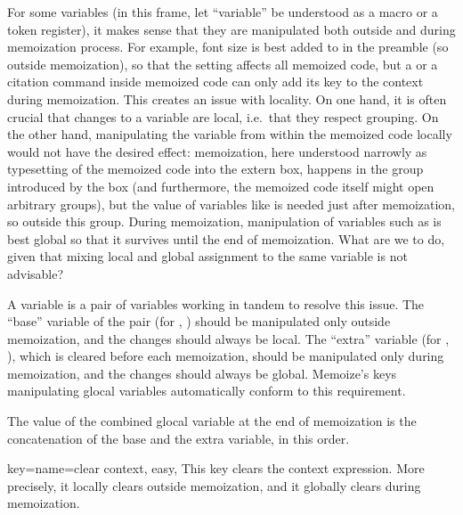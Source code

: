 \documentclass[a4paper,11pt]{article}
\begin{document}
\begin{tcolorbox}[title=Glocal variables, label=frame:glocal]
  For some variables (in this frame, let ``variable'' be understood as a macro
  or a token register), it makes sense that they are manipulated both outside
  and during memoization process.  For example, font size is best added to
   in the preamble (so outside memoization), so that the
  setting affects all memoized code, but a  or a citation command
  inside memoized code can only add its key to the context during memoization.
  This creates an issue with locality.  On one hand, it is often crucial that
  changes to a variable are local, i.e.\ that they respect 
  grouping.  On the other hand, manipulating the variable from within the
  memoized code locally would not have the desired effect: memoization, here
  understood narrowly as typesetting of the memoized code into the extern box,
  happens in the  group introduced by the box (and furthermore, the
  memoized code itself might open arbitrary groups), but the value of variables
  like  is needed just after memoization, so outside this
  group.  During memoization, manipulation of variables such as
   is best global so that it survives until the end of
  memoization.  What are we to do, given that mixing local and global
  assignment to the same variable is not advisable?
  
  A  variable is a pair of variables working in tandem to resolve
  this issue.  The ``base'' variable of the pair (for ,
  ) should be manipulated only outside memoization, and the
  changes should always be local.  The ``extra'' variable (for
  , ), which is cleared before each
  memoization, should be manipulated only during memoization, and the changes
  should always be global.  Memoize's keys manipulating glocal variables
  automatically conform to this requirement.

  The value of the combined glocal variable at the end of memoization is the
  concatenation of the base and the extra variable, in this order.
\end{tcolorbox}

\begin{doc}{
    key={name=clear context, easy},
  }
  This key clears the context expression.  More precisely, it locally clears
   outside memoization, and it globally clears
   during memoization.
\end{doc}
\end{document}
